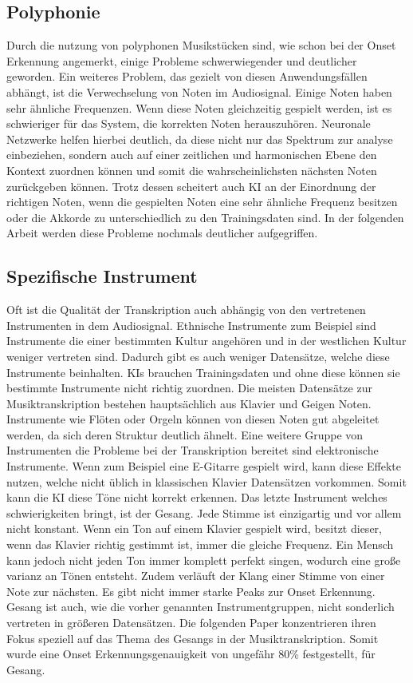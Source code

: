 \subsection{Polyphonie}
Durch die nutzung von polyphonen Musikstücken sind, wie schon bei der Onset Erkennung angemerkt,
einige Probleme schwerwiegender und deutlicher geworden.
Ein weiteres Problem, das gezielt von diesen Anwendungsfällen abhängt, ist die Verwechselung von Noten im Audiosignal.
Einige Noten haben sehr ähnliche Frequenzen.
Wenn diese Noten gleichzeitig gespielt werden, ist es schwieriger für das System, die korrekten Noten herauszuhören.
Neuronale Netzwerke helfen hierbei deutlich, da diese nicht nur das Spektrum zur analyse einbeziehen,
sondern auch auf einer zeitlichen und harmonischen Ebene den Kontext zuordnen können
und somit die wahrscheinlichsten nächsten Noten zurückgeben können.
Trotz dessen scheitert auch KI an der Einordnung der richtigen Noten, wenn die gespielten Noten
eine sehr ähnliche Frequenz besitzen oder die Akkorde zu unterschiedlich zu den Trainingsdaten sind.
In der folgenden Arbeit werden diese Probleme nochmals deutlicher aufgegriffen.
\cite{martak2022balancing}

\subsection{Spezifische Instrument}
Oft ist die Qualität der Transkription auch abhängig von den vertretenen Instrumenten in dem Audiosignal.
Ethnische Instrumente zum Beispiel sind Instrumente die einer bestimmten Kultur angehören
und in der westlichen Kultur weniger vertreten sind.
Dadurch gibt es auch weniger Datensätze, welche diese Instrumente beinhalten.
KIs brauchen Trainingsdaten und ohne diese können sie bestimmte Instrumente nicht richtig zuordnen.
Die meisten Datensätze zur Musiktranskription bestehen hauptsächlich aus Klavier und Geigen Noten.
Instrumente wie Flöten oder Orgeln können von diesen Noten gut abgeleitet werden,
da sich deren Struktur deutlich ähnelt.
Eine weitere Gruppe von Instrumenten die Probleme bei der Transkription bereitet sind elektronische Instrumente.
Wenn zum Beispiel eine E-Gitarre gespielt wird, kann diese Effekte nutzen,
welche nicht üblich in klassischen Klavier Datensätzen vorkommen.
Somit kann die KI diese Töne nicht korrekt erkennen.
Das letzte Instrument welches schwierigkeiten bringt, ist der Gesang.
Jede Stimme ist einzigartig und vor allem nicht konstant.
Wenn ein Ton auf einem Klavier gespielt wird, besitzt dieser,
wenn das Klavier richtig gestimmt ist, immer die gleiche Frequenz.
Ein Mensch kann jedoch nicht jeden Ton immer komplett perfekt singen, wodurch eine große varianz an Tönen entsteht.
Zudem verläuft der Klang einer Stimme von einer Note zur nächsten.
Es gibt nicht immer starke Peaks zur Onset Erkennung.
Gesang ist auch, wie die vorher genannten Instrumentgruppen, nicht sonderlich vertreten in größeren Datensätzen.
Die folgenden Paper konzentrieren ihren Fokus speziell auf das Thema des Gesangs in der Musiktranskription.
\cite{gu2023deep,gu2024automatic}
Somit wurde eine Onset Erkennungsgenauigkeit von ungefähr 80\% festgestellt, für Gesang.

